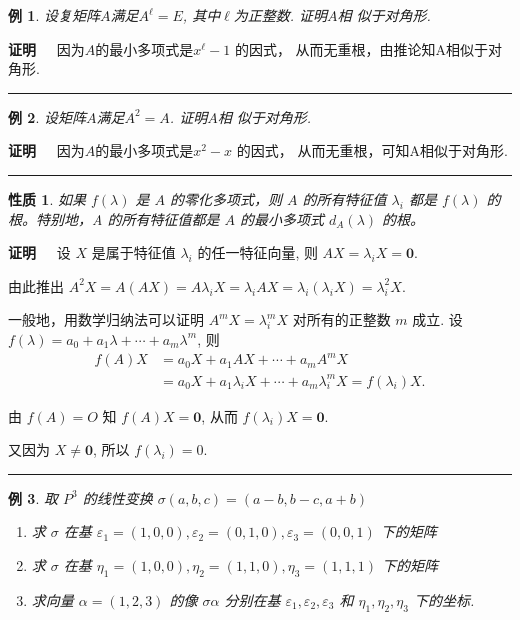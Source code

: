 \documentclass[13pt]{beamer}
\newtheorem{exa}{例}
\newtheorem*{prop}{性质}
\def\qed{\nopagebreak\hfill{\rule{4pt}{7pt}}\medbreak}
\def\pf{{\bf 证明~~ }}
\def\0{\mathbf{0}}
\begin{document}
\begin{frame}
\begin{exa}
设复矩阵$A$满足$A^\ell=E$, 其中$\ell$为正整数. 证明$A$相
似于对角形. 
\end{exa} 
\pf 因为$A$的最小多项式是$x^\ell-1$ 的因式，
从而无重根，由推论知A相似于对角形. 
\qed

\begin{exa}
	设矩阵$A$满足$A^{2}=A$. 证明$A$相
	似于对角形. 
\end{exa} 
\pf 因为$A$的最小多项式是$x^2-x$ 的因式，
从而无重根，可知A相似于对角形. 
\qed
\end{frame}


\begin{frame}

\begin{prop}
如果 $f(\lambda)$ 是 $A$ 的零化多项式，则 $A$ 的所有特征值 $\lambda_{i}$ 都是
$f(\lambda)$ 的根。特别地，A 的所有特征值都是 $A$ 的最小多项式 $d_{A}(\lambda)$ 的根。 
\end{prop}

\pf 设 $X$ 是属于特征值 $\lambda_{i}$ 的任一特征向量, 则 $A X=\lambda_{i} X=\0 .$ 

由此推出
$
A^{2} X=A(A X)=A \lambda_{i} X=\lambda_{i} A X=\lambda_{i}\left(\lambda_{i} X\right)=\lambda_{i}^{2} X.
$

一般地，用数学归纳法可以证明 $A^{m} X=\lambda_{i}^{m} X$ 对所有的正整数 $m$ 成立.
设
$
f(\lambda)=a_{0}+a_{1} \lambda+\cdots+a_{m} \lambda^{m}$,  { 则 } 
\begin{align*}
f({A}) {X} &=a_{0} {X}+a_{1} A {X}+\cdots+a_{m} {A}^{m} {X} \\
&=a_{0} {X}+a_{1} \lambda_{i} {X}+\cdots+a_{m} \lambda_{i}^{m} {X}=f\left(\lambda_{i}\right) X.
\end{align*}

由  $f({A})={O}$  知 
$f(A) X=\0$, 
 从而  $f\left(\lambda_{i}\right) X=\0$.
 
又因为 $X \neq \0$,  { 所以 } $f\left(\lambda_{i}\right)= 0$.
 \qed
\end{frame}

\setcounter{exa}{0}

\begin{frame}
\begin{exa}
取 $P^{3}$ 的线性变换 $\sigma(a, b, c)=(a-b, b-c, a+b)$
\begin{enumerate}
\item  求 $\sigma$ 在基 $\varepsilon_{1}=(1,0,0), \varepsilon_{2}=(0,1,0), \varepsilon_{3}=(0,0,1)$ 下的矩阵
\item  求 $\sigma$ 在基 $\eta_{1}=(1,0,0), \eta_{2}=(1,1,0), \eta_{3}=(1,1,1)$ 下的矩阵
\item  求向量 $\alpha=(1,2,3)$ 的像 $\sigma \alpha$ 分别在基 $\varepsilon_{1}, \varepsilon_{2}, \varepsilon_{3}$ 和 $\eta_{1}, \eta_{2}, \eta_{3}$ 下的坐标.
\end{enumerate}
\end{exa}
\end{frame}
\end{document}

